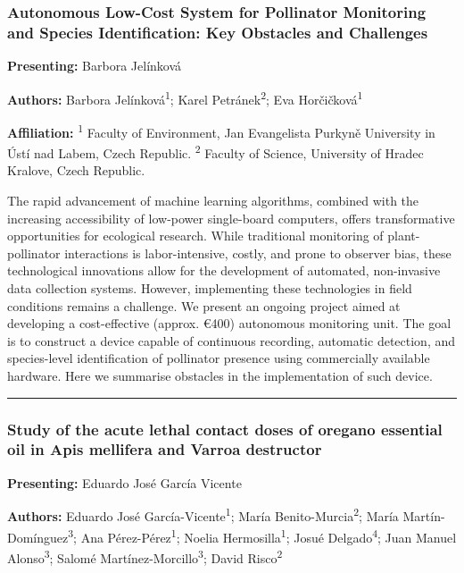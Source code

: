 \documentclass[
  letterpaper,
  DIV=11,
  numbers=noendperiod]{scrartcl}
\begin{document}
\subsubsection{Autonomous Low-Cost System for Pollinator Monitoring and
Species Identification: Key Obstacles and
Challenges}\label{autonomous-low-cost-system-for-pollinator-monitoring-and-species-identification-key-obstacles-and-challenges}

\textbf{Presenting:} Barbora Jelínková

\textbf{Authors:} Barbora Jelínková\textsuperscript{1}; Karel
Petránek\textsuperscript{2}; Eva Horčičková\textsuperscript{1}

\textbf{Affiliation:} \textsuperscript{1} Faculty of Environment, Jan
Evangelista Purkyně University in Ústí nad Labem, Czech Republic.
\textsuperscript{2} Faculty of Science, University of Hradec Kralove,
Czech Republic.

The rapid advancement of machine learning algorithms, combined with the
increasing accessibility of low-power single-board computers, offers
transformative opportunities for ecological research. While traditional
monitoring of plant-pollinator interactions is labor-intensive, costly,
and prone to observer bias, these technological innovations allow for
the development of automated, non-invasive data collection systems.
However, implementing these technologies in field conditions remains a
challenge. We present an ongoing project aimed at developing a
cost-effective (approx. €400) autonomous monitoring unit. The goal is to
construct a device capable of continuous recording, automatic detection,
and species-level identification of pollinator presence using
commercially available hardware. Here we summarise obstacles in the
implementation of such device.

\begin{center}\rule{0.5\linewidth}{0.5pt}\end{center}

\subsubsection{Study of the acute lethal contact doses of oregano
essential oil in Apis mellifera and Varroa
destructor}\label{study-of-the-acute-lethal-contact-doses-of-oregano-essential-oil-in-apis-mellifera-and-varroa-destructor}

\textbf{Presenting:} Eduardo José García Vicente

\textbf{Authors:} Eduardo José García-Vicente\textsuperscript{1}; María
Benito-Murcia\textsuperscript{2}; María
Martín-Domínguez\textsuperscript{3}; Ana Pérez-Pérez\textsuperscript{1};
Noelia Hermosilla\textsuperscript{1}; Josué Delgado\textsuperscript{4};
Juan Manuel Alonso\textsuperscript{3}; Salomé
Martínez-Morcillo\textsuperscript{3}; David Risco\textsuperscript{2}
\end{document}
